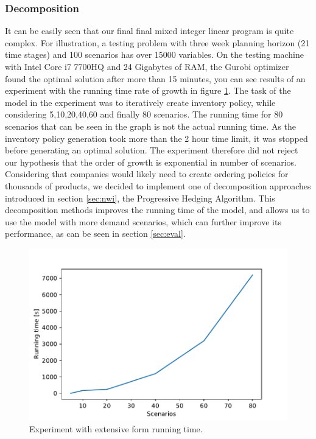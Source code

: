 \documentclass[11pt,a4paper]{article}
\begin{document}
\subsubsection{Decomposition}
It can be easily seen that our final final mixed integer linear program is quite complex. For illustration, a testing problem with three week planning horizon (21 time stages) and 100 scenarios has over 15000 variables. On the testing machine with Intel Core i7 7700HQ and 24 Gigabytes of RAM, the Gurobi optimizer found the optimal solution after more than 15 minutes, you can see results of an experiment with the running time rate of growth in figure \ref{fig:ext_runtime}. The task of the model in the experiment was to iteratively create inventory policy, while considering 5,10,20,40,60 and finally 80 scenarios. The running time for 80 scenarios that can be seen in the graph is not the actual running time. As the inventory policy generation took more than the 2 hour time limit, it was stopped before generating an optimal solution. The experiment therefore did not reject our hypothesis that the order of growth is exponential in number of scenarios. Considering that companies would likely need to create ordering policies for thousands of products, we decided to implement one of decomposition approaches introduced in section \ref{sec:nwi}, the Progressive Hedging Algorithm. This decomposition methods improves the running time of the model, and allows us to use the model with more demand scenarios, which can further improve its performance, as can be seen in section \ref{sec:eval}.

\begin{figure}
  \includegraphics[width=\linewidth]{figures/running_time.pdf}
  \caption[Experiment with extensive form running time]{Experiment with extensive form running time.}
  \label{fig:ext_runtime}
\end{figure}
\end{document}
